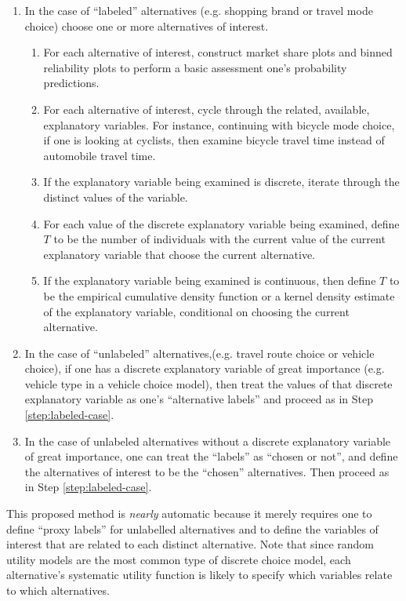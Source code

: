 \documentclass[preprint]{elsarticle}
\begin{document}
\begin{enumerate}
\item In the case of ``labeled'' alternatives (e.g. shopping brand or travel mode choice) choose one or more alternatives of interest.
\label{step:labeled-case}

	\begin{enumerate}
	\item For each alternative of interest, construct market share plots and binned reliability plots to perform a basic assessment one's probability predictions.
	\item For each alternative of interest, cycle through the related, available, explanatory variables. For instance, continuing with bicycle mode choice, if one is looking at cyclists, then examine bicycle travel time instead of automobile travel time.
	\item If the explanatory variable being examined is discrete, iterate through the distinct values of the variable.
	\item For each value of the discrete explanatory variable being examined, define $T$ to be the number of individuals with the current value of the current explanatory variable that choose the current alternative.
	\item If the explanatory variable being examined is continuous, then define $T$ to be the empirical cumulative density function or a kernel density estimate of the explanatory variable, conditional on choosing the current alternative.
	\end{enumerate}
	
\item In the case of ``unlabeled'' alternatives,(e.g. travel route choice or vehicle choice), if one has a discrete explanatory variable of great importance (e.g. vehicle type in a vehicle choice model), then treat the values of that discrete explanatory variable as one's ``alternative labels'' and proceed as in Step \ref{step:labeled-case}.

\item In the case of unlabeled alternatives without a discrete explanatory variable of great importance, one can treat the ``labels'' as ``chosen or not'', and define the alternatives of interest to be the ``chosen'' alternatives. Then proceed as in Step \ref{step:labeled-case}.
\end{enumerate}

This proposed method is \textit{nearly} automatic because it merely requires one to define ``proxy labels'' for unlabelled alternatives and to define the variables of interest that are related to each distinct alternative. Note that since random utility models are the most common type of discrete choice model, each alternative's systematic utility function is likely to specify which variables relate to which alternatives.
\end{document}
